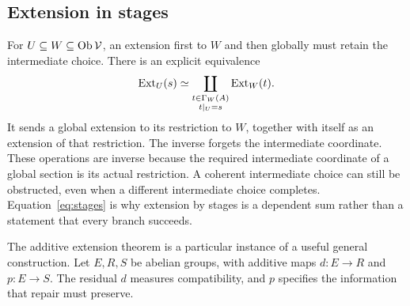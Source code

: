 \subsection{Extension in stages}
For \(U\subseteq W\subseteq\operatorname{Ob}\mathcal V\), an extension first to \(W\) and then globally must retain the intermediate choice. There is an explicit equivalence
\begin{equation}\label{eq:stages}
 \operatorname{Ext}_U(s)\simeq
 \coprod_{\substack{t\in\Gamma_W(A)\\t|_U=s}}\operatorname{Ext}_W(t).
\end{equation}
It sends a global extension to its restriction to \(W\), together with itself as an extension of that restriction. The inverse forgets the intermediate coordinate. These operations are inverse because the required intermediate coordinate of a global section is its actual restriction. A coherent intermediate choice can still be obstructed, even when a different intermediate choice completes. Equation~\eqref{eq:stages} is why extension by stages is a dependent sum rather than a statement that every branch succeeds.

\label{sec:protected}
The additive extension theorem is a particular instance of a useful general construction. Let \(E,R,S\) be abelian groups, with additive maps \(d:E\to R\) and \(p:E\to S\). The residual \(d\) measures compatibility, and \(p\) specifies the information that repair must preserve.

